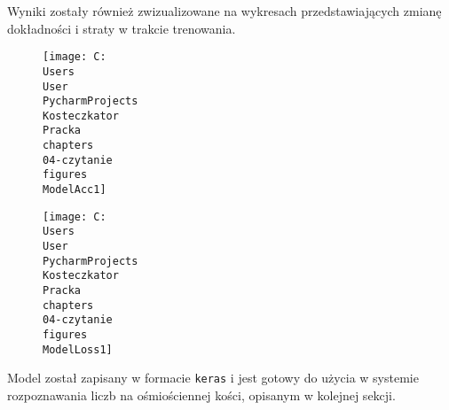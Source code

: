 Wyniki zostały również zwizualizowane na wykresach przedstawiających zmianę dokładności i straty w trakcie trenowania.
\begin{figure}[Hh]
    \centering
    \texttt{[image: C:\\Users\\User\\PycharmProjects\\Kosteczkator\\Pracka\\chapters\\04-czytanie\\figures\\ModelAcc1]}
    \caption{}
    \label{fig:ModelAcc}
\end{figure}

\begin{figure}[hH]
    \centering
    \texttt{[image: C:\\Users\\User\\PycharmProjects\\Kosteczkator\\Pracka\\chapters\\04-czytanie\\figures\\ModelLoss1]}
    \caption{}
    \label{fig:ModelLoss}
\end{figure}

Model został zapisany w formacie \texttt{keras} i jest gotowy do użycia w systemie rozpoznawania liczb na ośmiościennej kości, opisanym w kolejnej sekcji.

